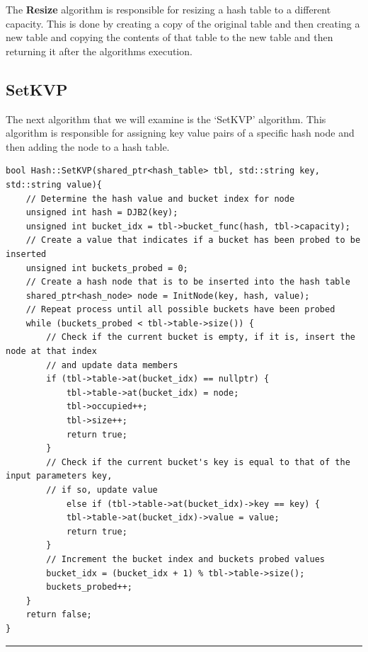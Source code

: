 \documentclass[a4paper,9pt]{article}
\newcommand{\horizontalline}{\noindent \rule{\textwidth}{0.5pt}\par}
\begin{document}
\noindent The \textbf{Resize} algorithm is responsible for resizing a hash table to a different capacity. This is done by creating a copy of the original table and then creating a new table and copying the
contents of that table to the new table and then returning it after the algorithms execution.

\subsection*{SetKVP}

The next algorithm that we will examine is the `SetKVP' algorithm. This algorithm is responsible for assigning key value pairs of a specific hash node and then adding the node to a hash table.

\begin{highlight}

\begin{verbatim}
bool Hash::SetKVP(shared_ptr<hash_table> tbl, std::string key, std::string value){
    // Determine the hash value and bucket index for node
    unsigned int hash = DJB2(key);
    unsigned int bucket_idx = tbl->bucket_func(hash, tbl->capacity);
    // Create a value that indicates if a bucket has been probed to be inserted
    unsigned int buckets_probed = 0;
    // Create a hash node that is to be inserted into the hash table
    shared_ptr<hash_node> node = InitNode(key, hash, value);
    // Repeat process until all possible buckets have been probed
    while (buckets_probed < tbl->table->size()) {
        // Check if the current bucket is empty, if it is, insert the node at that index 
        // and update data members
        if (tbl->table->at(bucket_idx) == nullptr) {
            tbl->table->at(bucket_idx) = node;
            tbl->occupied++;
            tbl->size++;
            return true;
        }
        // Check if the current bucket's key is equal to that of the input parameters key, 
        // if so, update value
            else if (tbl->table->at(bucket_idx)->key == key) {
            tbl->table->at(bucket_idx)->value = value;
            return true;
        }
        // Increment the bucket index and buckets probed values
        bucket_idx = (bucket_idx + 1) % tbl->table->size();
        buckets_probed++;
    }
    return false;
}
\end{verbatim}

\horizontalline


\end{highlight}
\end{document}

